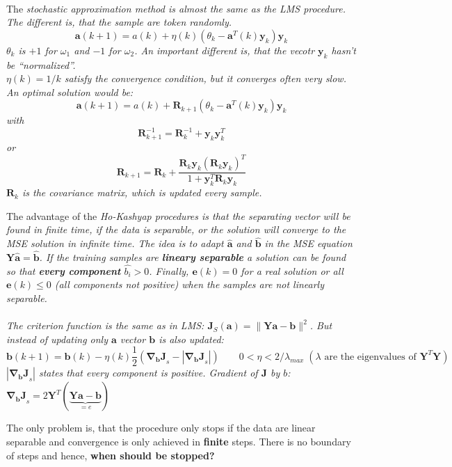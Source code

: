      
    
 	
 	
 	\\
 	
 	The \em stochastic approximation method \em is almost the same as the LMS procedure. The different is, that the sample are token randomly. 
 	$$ \bm a(k+1)=a(k)+\eta(k)(\theta_k - \bm a^T(k)\bm y_k)\bm y_k$$
 	$\theta_k$ is $+1$ for $\omega_1$ and $-1$ for $\omega_2$. An important different is, that the vecotr $\bm y_k$ hasn't be ``normalized''. \\
 	$\eta(k)=1/k$ satisfy the convergence condition, but it converges often very slow. An optimal solution would be:
 	$$ \bm a(k+1)=a(k)+\bm R_{k+1}(\theta_k - \bm a^T(k)\bm y_k)\bm y_k$$
 	with $$\bm R_{k+1}^{-1}= \bm R_{k}^{-1} + \bm y_k \bm y_k^T$$ or
	$$\bm R_{k+1}= \bm R_{k} + \frac{\bm R_{k} \bm y_k(\bm R_{k} \bm y_k)^T}{1+\bm y_k^T \bm R_{k} \bm y_k}$$
 	$\bm R_{k}$ is the covariance matrix, which is updated every sample.
 	
 	
 	The advantage of the \em Ho-Kashyap procedures \em is that the separating vector will be found in finite time, if the data is separable, or the 
 	solution will converge to the MSE solution in infinite time.
 	The idea is to adapt $\hat{\bm a}$ and $\hat{\bm b}$ in the MSE equation $\bm Y \hat{\bm a} = \hat{\bm b}$.
 	If the training samples are \textbf{lineary separable} a solution can be found so that 
 	\textbf{every component} $\hat{b_i}> 0$. Finally, $\bm e(k) = 0$ for a real solution or 
 	all $\bm e(k) \leq 0$ (all components not positive) when the samples are not linearly separable.\\
 	
 	\\
 	The criterion function is the same as in LMS: $\bm J_S(\bm a)=\|\bm Y \bm a - \bm b \|^2$. But instead of updating only $\bm a$ vector $\bm b$
  is also updated:
 	$$ \bm b(k+1)=\bm b(k)- \eta(k) \frac{1}{2} \left(\bm{\nabla_b J}_s - |\bm{\nabla_b J}_s|\right) \qquad 
 	0 <\eta < 2/\lambda_{max} \; (\lambda \text{ are the eigenvalues of } \bm Y^T \bm Y)$$
 	$|\bm{\nabla_b J}_s|$ states that every component is positive. 
 	Gradient of $\bm J$ by $b$: $\bm{\nabla_b J}_s = 2\bm Y^T(\underbrace{\bm{Y a - b}}_{=e})$
 	
 	The only problem is, that the procedure only stops if the data are linear separable and convergence 
 	is only achieved in \textbf{finite} steps. There is no boundary of steps and hence, \textbf{when should be stopped?}\\
 	 
